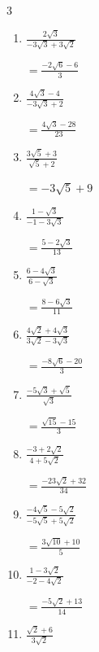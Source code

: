 \begin{multicols}{3}
\begin{enumerate}
        $\displaystyle =\frac{-5}{4}$

  \item $\displaystyle \frac{2\sqrt{3}}{-3\sqrt{3}+3\sqrt{2}}$

        $\displaystyle =\frac{-2\sqrt{6}-6}{3}$

  \item $\displaystyle \frac{4\sqrt{3}-4}{-3\sqrt{3}+2}$

        $\displaystyle =\frac{4\sqrt{3}-28}{23}$

\columnbreak %

\resetques

  \item $\displaystyle \frac{3\sqrt{5}+3}{\sqrt{5}+2}$

        $\displaystyle =-3\sqrt{5}+9$

  \item $\displaystyle \frac{1-\sqrt{3}}{-1-3\sqrt{3}}$

        $\displaystyle =\frac{5-2\sqrt{3}}{13}$

  \item $\displaystyle \frac{6-4\sqrt{3}}{6-\sqrt{3}}$

        $\displaystyle =\frac{8-6\sqrt{3}}{11}$

  \item $\displaystyle \frac{4\sqrt{2}+4\sqrt{3}}{3\sqrt{2}-3\sqrt{3}}$

        $\displaystyle =\frac{-8\sqrt{6}-20}{3}$

  \item $\displaystyle \frac{-5\sqrt{3}+\sqrt{5}}{\sqrt{3}}$

        $\displaystyle =\frac{\sqrt{15}-15}{3}$

\columnbreak %

  \item $\displaystyle \frac{-3+2\sqrt{2}}{4+5\sqrt{2}}$

        $\displaystyle =\frac{-23\sqrt{2}+32}{34}$

  \item $\displaystyle \frac{-4\sqrt{5}-5\sqrt{2}}{-5\sqrt{5}+5\sqrt{2}}$

        $\displaystyle =\frac{3\sqrt{10}+10}{5}$

  \item $\displaystyle \frac{1-3\sqrt{2}}{-2-4\sqrt{2}}$

        $\displaystyle =\frac{-5\sqrt{2}+13}{14}$

  \item $\displaystyle \frac{\sqrt{2}+6}{3\sqrt{2}}$


\end{enumerate}
\end{multicols}
